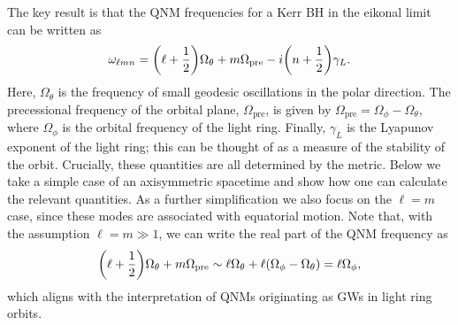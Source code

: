 The key result is that the QNM frequencies for a Kerr BH in the eikonal limit can be written as
\begin{equation}
    \omega_{\ell m n} = \qty(\ell + \frac{1}{2}) \Omega_\theta + m \Omega_\mathrm{pre} - i \qty(n + \frac{1}{2}) \gamma_L.
\end{equation}
Here, $\Omega_\theta$ is the frequency of small geodesic oscillations in the polar direction. 
The precessional frequency of the orbital plane, $\Omega_\mathrm{pre}$, is given by $\Omega_\mathrm{pre} = \Omega_\phi - \Omega_\theta$, where $\Omega_\phi$ is the orbital frequency of the light ring.
Finally, $\gamma_L$ is the Lyapunov exponent of the light ring; this can be thought of as a measure of the stability of the orbit.
Crucially, these quantities are all determined by the metric. 
Below we take a simple case of an axisymmetric spacetime and show how one can calculate the relevant quantities.
As a further simplification we also focus on the $\ell = m$ case, since these modes are associated with equatorial motion. 
Note that, with the assumption $\ell = m \gg 1$, we can write the real part of the QNM frequency as
\begin{equation}
    \qty(\ell + \frac{1}{2}) \Omega_\theta + m \Omega_\mathrm{pre} \sim \ell \Omega_\theta + \ell \qty(\Omega_\phi - \Omega_\theta) = \ell \Omega_\phi,
\end{equation}
which aligns with the interpretation of QNMs originating as GWs in light ring orbits.

